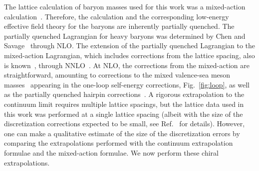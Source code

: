 \documentclass[twocolumn,nofootinbib,prd,aps,superscriptaddress,tightenlines]{revtex4}
\begin{document}
The lattice calculation of baryon masses used for this work was a mixed-action calculation~\cite{WalkerLoud:2008bp}.  Therefore, the calculation and the corresponding low-energy effective field theory for the baryons are inherently partially quenched.  The partially quenched Lagrangian for heavy baryons was determined by Chen and Savage~\cite{Chen:2001yi} through NLO.  The extension of the partially quenched Lagrangian to the mixed-action Lagrangian, which includes corrections from the lattice spacing, also is known~\cite{Tiburzi:2005is,Chen:2007ug}, through NNLO~\cite{Chen:2007ug,WalkerLoud:2004hf,Tiburzi:2004rh}.  At NLO, the corrections from the mixed-action are straightforward, amounting to corrections to the mixed valence-sea meson masses~\cite{Orginos:2007tw} appearing in the one-loop self-energy corrections, Fig.~\ref{fig:loop}, as well as the partially quenched hairpin corrections~\cite{Chen:2001yi}.  A rigorous extrapolation to the continuum limit requires multiple lattice spacings, but the lattice data used in this work was performed at a single lattice spacing (albeit with the size of the discretization corrections expected to be small, see Ref.~\cite{WalkerLoud:2008bp} for details).  However, one can make a qualitative estimate of the size of the discretization errors by comparing the extrapolations performed with the continuum extrapolation formulae and the mixed-action formulae. We now perform these chiral extrapolations. 


%
\end{document}

